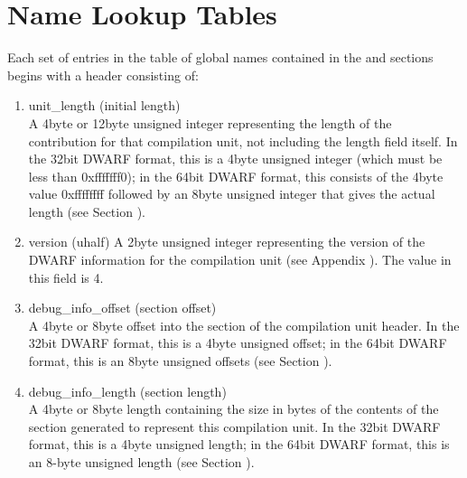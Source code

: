 \section{Name Lookup Tables}
\label{datarep:namelookuptables}

Each set of entries in the table of global names contained
in the  and 
 sections begins
with a header consisting of:


\begin{enumerate}[1.]
\item unit\_length (initial length) \\
A 4\dash byte or 12\dash byte unsigned integer representing the length
of the 
contribution for that compilation unit,
not including the length field itself. In the 32\dash bit DWARF
format, this is a 4\dash byte unsigned integer (which must be less
than 0xfffffff0); in the 64\dash bit DWARF format, this consists
of the 4\dash byte value 0xffffffff followed by an 8\dash byte unsigned
integer that gives the actual length
(see Section ).

\item  version (uhalf)
A 2\dash byte unsigned integer representing the version of the
DWARF information for the compilation unit
(see Appendix ).
The value in this field is 4.

\item debug\_info\_offset (section offset) \\
A 4\dash byte or 8\dash byte offset into the 
section of the compilation unit header.
In
the 32\dash bit DWARF format, this is a 4\dash byte unsigned offset;
in the 64\dash bit DWARF format, this is an 8\dash byte unsigned offsets
(see Section ).

\item  debug\_info\_length (section length) \\
A 4\dash byte or 8\dash byte length containing the size in bytes of the
contents of the 
section generated to represent
this compilation unit. In the 32\dash bit DWARF format, this is
a 4\dash byte unsigned length; in the 64\dash bit DWARF format, this
is an 8-byte unsigned length 
(see Section ).


\end{enumerate}


